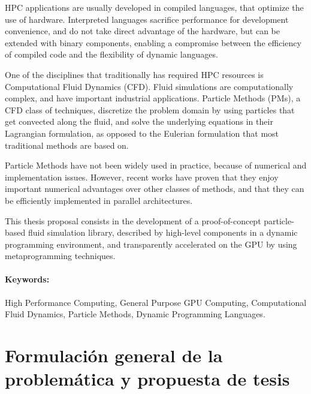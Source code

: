 \documentclass[11pt,spanish]{article}
\begin{document}
HPC applications are usually developed in compiled languages, that optimize the
use of hardware.  Interpreted languages sacrifice performance for development
convenience, and do not take direct advantage of the hardware, but can be
extended with binary components, enabling a compromise between the efficiency of
compiled code and the flexibility of dynamic languages.

One of the disciplines that traditionally has required HPC resources is
Computational Fluid Dynamics (CFD).
Fluid simulations are computationally complex, and have important industrial
applications.
Particle Methods (PMs), a CFD class of techniques, discretize the problem domain
by using particles that get convected along the fluid, and solve the underlying
equations in their Lagrangian formulation, as opposed to the Eulerian
formulation that most traditional methods are based on.

Particle Methods have not been widely used in practice, because of numerical and
implementation issues.  However, recent works have proven that they enjoy
important numerical advantages over other classes of methods, and that they can
be efficiently implemented in parallel architectures.

This thesis proposal consists in the development of a proof-of-concept
particle-based fluid simulation library, described by high-level components in a
dynamic programming environment, and transparently accelerated on the GPU by
using metaprogramming techniques.

\paragraph{Keywords:}
High Performance Computing,
General Purpose GPU Computing,
Computational Fluid Dynamics,
Particle Methods,
Dynamic Programming Languages.

\newpage
\section{Formulación general de la problemática y propuesta de tesis}

%
\end{document}
